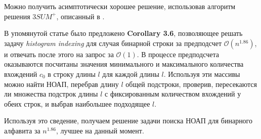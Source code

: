 Можно получить асимптотически хорошее решение, использовав алгоритм решения $3SUM^+$, описанный в \cite{2}. 

В упомянутой статье было предложено \textbf{Corollary 3.6}, позволяющее решать задачу \textit{histogram indexing} для случая бинарной строки за предподсчет $\mathcal{O}(n^{1.86})$, и отвечать после этого на запрос за $\mathcal{O}(1)$. В процессе предподсчета оказываются посчитаны значения минимального и максимального количества вхождений $c_0$ в строку длины $l$ для каждой длины $l$. Используя эти массивы можно найти НОАП, перебрав длину $l$ общей подстроки, проверив, пересекаются ли множества подстрок длины $l$ с фиксированным количеством вхождений у обеих строк, и выбрав наибольшее подходящее $l$.

Используя это сведение, получаем решение задачи поиска НОАП для бинарного алфавита за $n^{1.86}$, лучшее на данный момент.
